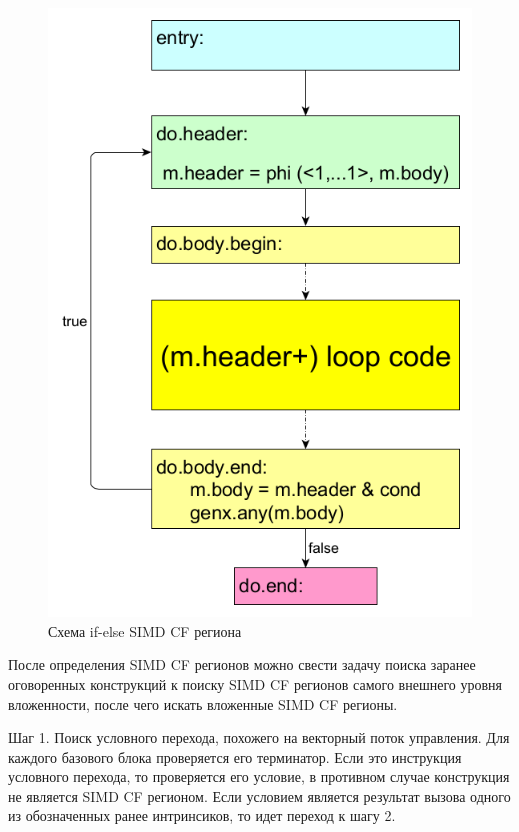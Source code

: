 \begin{figure}
  \centering
  \includegraphics[scale=0.27]{Images/do-while-FE-generalized-colored.png}
  \caption{Схема if-else SIMD CF региона}
  \label{fig:generalized-loop-simdcf}
\end{figure}

После определения SIMD CF регионов можно свести задачу поиска заранее
оговоренных конструкций к поиску SIMD CF регионов самого внешнего уровня
вложенности, после чего искать вложенные SIMD CF регионы.

Шаг 1. Поиск условного перехода, похожего на векторный поток управления. Для
каждого базового блока проверяется его терминатор. Если это инструкция условного
перехода, то проверяется его условие, в противном случае конструкция не является
SIMD CF регионом. Если условием является результат вызова одного из обозначенных
ранее интринсиков, то идет переход к шагу 2.

